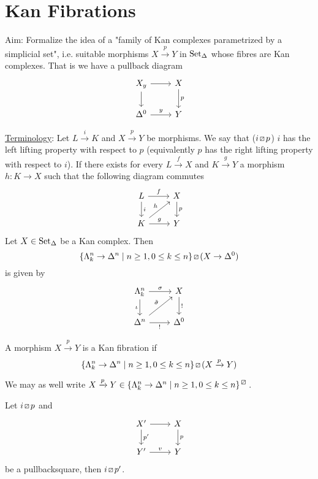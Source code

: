\section{Kan Fibrations}

Aim: Formalize the idea of a "family of Kan complexes parametrized by a simplicial set", i.e. suitable morphisms $X \xrightarrow{p} Y$ in $\operatorname{Set}_{\Delta}$ whose fibres are Kan complexes.
That is we have a pullback diagram
\[
\begin{tikzcd}
    X_y
    \arrow[d]
    \ar[r]
    &
    X
    \ar[d,"p"]
    \\
    \Delta^0
    \ar[r,"y"]
    &
    Y    
\end{tikzcd}
\]

\underline{Terminology}:
Let $ L \xrightarrow{i} K$ and $ X \xrightarrow{p} Y$ be morphisms.
We say that ($ i \lift{} p$) $i$ has the left lifting property with respect to $p$ (equivalently $p$ has the right lifting property with respect to $i$).
If there exists for every $L \xrightarrow{f} X$ and $K \xrightarrow{g}Y$ a morphism $h:K \to X$ such that the following diagram commutes
\[
\begin{tikzcd}
    L
    \arrow[d,"i"]
    \ar[r, "f"]
    &
    X
    \ar[d,"p"]
    \\
    K
    \ar[ru,"h"]
    \ar[r,"g"]
    &
    Y    
\end{tikzcd}
\]
Let $X \in \operatorname{Set}_{\Delta}$ be a Kan complex. 
Then 
\[
\{ \Lambda_k^n \to \Delta^n \mid n\geq 1 ,0 \leq k \leq n \} \lift{} (X \to \Delta^0)
\]
is given by 
\[
\begin{tikzcd}
    \Lambda_k^n
    \arrow[d,"\iota"']
    \ar[r, "\sigma"]
    &
    X
    \ar[d,"!"]
    \\
    \Delta^n
    \ar[ru,"\Tilde{\sigma}"]
    \ar[r,"!"']
    &
    \Delta^0
\end{tikzcd}
\]

\begin{defi}
    A morphism $X \xrightarrow{p} Y$ is a Kan fibration if 
    \[
    \{ \Lambda_k^n \to \Delta^n \mid n\geq 1 ,0 \leq k \leq n \} \lift{} (X \xrightarrow{p} Y)
    \]
\end{defi}

\begin{rmk}
    We may as well write $X \xrightarrow{p} Y \in \{ \Lambda_k^n \to \Delta^n \mid n\geq 1 , 0 \leq k \leq n\}^{\lift{}}$.
\end{rmk}

\begin{lem}
    Let $i \lift{} p$ and
    \[
    \begin{tikzcd}
        X'
        \arrow[d,"p'"]
        \ar[r]
        &
        X
        \ar[d,"p"]
        \\
        Y'
        \ar[r,"v"]
        &
        Y    
    \end{tikzcd}
    \]
    be a pullbacksquare, then $i \lift{} p'$.
\end{lem}

